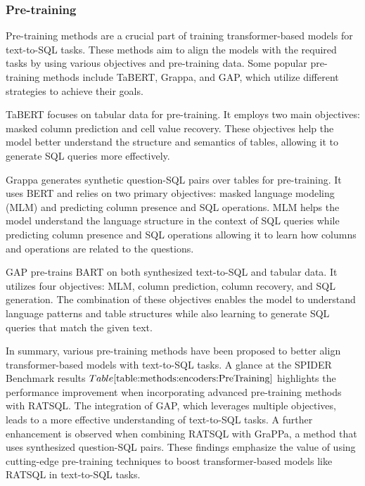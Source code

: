 \subsubsection{Pre-training}

Pre-training methods are a crucial part of training transformer-based models for text-to-SQL tasks. These methods aim to align the models with the required tasks by using various objectives and pre-training data. Some popular pre-training methods include TaBERT\cite{yin_tabert_2020}, Grappa\cite{DBLP:journals/corr/abs-2009-13845}, and GAP\cite{shi2020learning}, which utilize different strategies to achieve their goals.

TaBERT \cite{yin_tabert_2020} focuses on tabular data for pre-training. It employs two main objectives: masked column prediction and cell value recovery. These objectives help the model better understand the structure and semantics of tables, allowing it to generate SQL queries more effectively.

Grappa \cite{DBLP:journals/corr/abs-2009-13845} generates synthetic question-SQL pairs over tables for pre-training. It uses BERT and relies on two primary objectives: masked language modeling (MLM) and predicting column presence and SQL operations. MLM helps the model understand the language structure in the context of SQL queries while predicting column presence and SQL operations allowing it to learn how columns and operations are related to the questions.

GAP \cite{shi2020learning} pre-trains BART \cite{lewis-etal-2020-bart} on both synthesized text-to-SQL and tabular data. It utilizes four objectives: MLM, column prediction, column recovery, and SQL generation. The combination of these objectives enables the model to understand language patterns and table structures while also learning to generate SQL queries that match the given text.

In summary, various pre-training methods have been proposed to better align transformer-based models with text-to-SQL tasks. A glance at the SPIDER Benchmark results \(Table\ref{table:methods:encoders:PreTraining}\) highlights the performance improvement when incorporating advanced pre-training methods with RATSQL. The integration of GAP, which leverages multiple objectives, leads to a more effective understanding of text-to-SQL tasks. A further enhancement is observed when combining RATSQL with GraPPa, a method that uses synthesized question-SQL pairs. These findings emphasize the value of using cutting-edge pre-training techniques to boost transformer-based models like RATSQL in text-to-SQL tasks.

